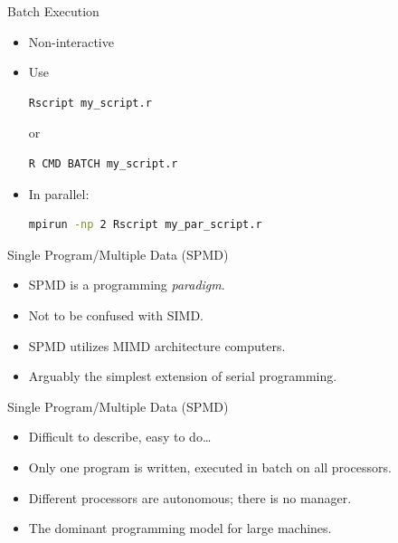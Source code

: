 \begin{frame}[fragile]
  \begin{block}{Batch Execution}\pause
    \begin{itemize}
      \item Non-interactive
      \item Use
\vspace{-.4cm}
\begin{lstlisting}[language=sh]
Rscript my_script.r
\end{lstlisting}
or\vspace{-.4cm}
\begin{lstlisting}[language=sh]
R CMD BATCH my_script.r
\end{lstlisting}
      \item In parallel:
\vspace{-.4cm}
\begin{lstlisting}[language=sh]
mpirun -np 2 Rscript my_par_script.r
\end{lstlisting}
    \end{itemize}
  \end{block}
\end{frame}


\begin{frame}
  \begin{block}{Single Program/Multiple Data (SPMD)}\pause
    \begin{itemize}
      \item SPMD is a programming \emph{paradigm}.
      \item Not to be confused with SIMD.
      \item SPMD utilizes MIMD architecture computers.
      \item Arguably the simplest extension of serial programming.
    \end{itemize}
  \end{block}
\end{frame}


\begin{frame}
  \begin{block}{Single Program/Multiple Data (SPMD)}\pause
    \begin{itemize}
      \item Difficult to describe, easy to do\dots
      \item Only one program is written, executed in batch on all processors.
      \item Different processors are autonomous; there is no manager.
      \item The dominant programming model for large machines.
    \end{itemize}
  \end{block}
\end{frame}



